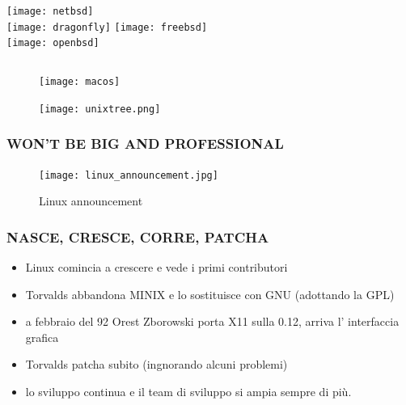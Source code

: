 \documentclass{beamer}
\begin{document}
\begin{frame}
    \begin{columns}[t]
            \centering
            \texttt{[image: netbsd]}\\
            \texttt{[image: dragonfly]}
            \centering
            \texttt{[image: freebsd]}\\ 
            \texttt{[image: openbsd]}
    \end{columns}
\end{frame}
\begin{frame}
    \begin{figure}
        \begin{center}
            \texttt{[image: macos]}                   
        \end{center}
    \end{figure}
\end{frame}




\begin{frame}[plain]
        \begin{figure}
            \begin{center}
                \texttt{[image: unixtree.png]}
            \caption{\href{https://en.wikipedia.org/wiki/Unix\#/media/File:Unix_history-simple.svg}{}}
        \end{center}
    \end{figure}
\end{frame}

\begin{frame}
    \frametitle{WON'T BE BIG AND PROFESSIONAL}
    \begin{figure}
            \begin{center}
                \texttt{[image: linux\_announcement.jpg]}
                \caption{Linux announcement}
            \end{center}
    \end{figure}
\end{frame}


\begin{frame}
    \frametitle{NASCE, CRESCE, CORRE, PATCHA}
        \begin{itemize}
            \item Linux comincia a crescere e vede i primi contributori
            \item Torvalds abbandona MINIX e lo sostituisce con GNU (adottando la GPL)
            \item a febbraio del 92 Orest Zborowski porta X11 sulla 0.12, arriva l' interfaccia grafica
            \item Torvalds patcha subito (ingnorando alcuni problemi)
            \item lo sviluppo continua e il team di sviluppo si ampia sempre di più.
        \end{itemize}
\end{frame}
\end{document}
